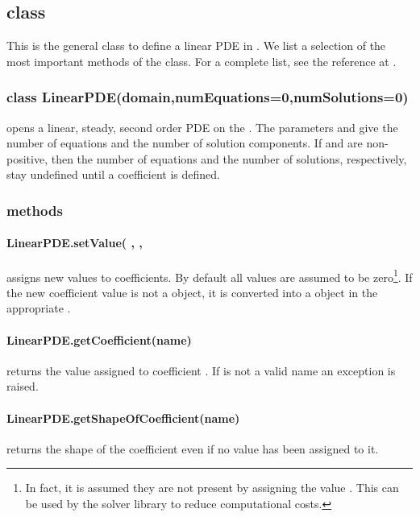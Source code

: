 \subsection{\LinearPDE class}
This is the general class to define a linear PDE in \escript.
We list a selection of the most important methods of the class.
For a complete list, see the reference at \ReferenceGuide.

\subsubsection*{class LinearPDE(domain,numEquations=0,numSolutions=0)}
opens a linear, steady, second order PDE on the \Domain {}.
The parameters  and  give the number of
equations and the number of solution components.
If  and  are non-positive, then the number
of equations and the number of solutions, respectively, stay undefined until a
coefficient is defined.


\subsubsection{\LinearPDE methods}
\paragraph{LinearPDE.setValue(
,
, }
assigns new values to coefficients. By default all values are assumed to be
zero\footnote{In fact, it is assumed they are not present by assigning the
value . This can be used by the solver library to reduce
computational costs.}.
If the new coefficient value is not a \Data object, it is converted into a
\Data object in the appropriate \FunctionSpace.


\paragraph{LinearPDE.getCoefficient(name)}
returns the value assigned to coefficient . If  is not a
valid name an exception is raised.


\paragraph{LinearPDE.getShapeOfCoefficient(name)}
returns the shape of the coefficient  even if no value has been
assigned to it.


